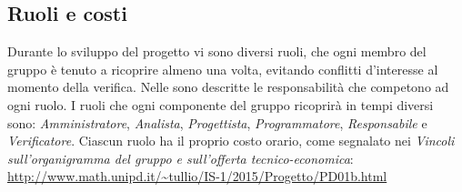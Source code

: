 \subsection{Ruoli e costi}
Durante lo sviluppo del progetto vi sono diversi ruoli, che ogni membro del gruppo è tenuto a ricoprire almeno una volta, evitando conflitti d’interesse al momento della verifica. Nelle \NormeDiProgetto sono descritte le responsabilità che competono ad ogni ruolo. I ruoli che ogni componente del gruppo ricoprirà in tempi diversi sono: \textit{Amministratore}, \textit{Analista}, \textit{Progettista}, \textit{Programmatore}, \textit{Responsabile} e \textit{Verificatore}.
Ciascun ruolo ha il proprio costo orario, come segnalato nei \textit{Vincoli sull’organigramma del gruppo e sull’offerta tecnico-economica}:
\url{http://www.math.unipd.it/~tullio/IS-1/2015/Progetto/PD01b.html}




